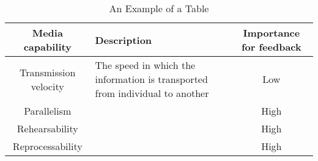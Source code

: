 \documentclass[conference]{IEEEtran}
\begin{document}
\begin{table}[!t]
\renewcommand{\arraystretch}{1.3}
\caption{An Example of a Table}
\label{table_example}
\centering
\begin{tabular}{|c|p{3cm}|c|}
\hline
\textbf{Media capability} & Description & \textbf{Importance for feedback}\\
\hline
Transmission velocity & The speed in which the information is transported from individual to another & Low\\
\hline
Parallelism & & High\\
\hline
Rehearsability & & High\\
\hline
Reprocessability & & High\\
\hline
\end{tabular}
\end{table}

\begin{comment}

NOPEA PÄÄTELMÄ: 
MST: Feedback: 

Contexti: Familiar, käytännössä siis: high conveyance, low convergence ==> less synchronicity

P1: Lower synchronicity
P2: Trasmission velocity improves synchronicity -> Lower transmission velovity
P3: Parallelism lower synchronicity -> High parallelism
P4(a): Natural symbols support synchronicity -> Use unnatural symbols
P4(b): Symbols better suited to content support synchronicity -> Use ill suited symbols
P5: Rehearsability lowers synchronicity -> High rehearsability
P6: Reproducability lowers synch -> High reproducability

--> 

lower transmission velocity, high parallelism, reharsability is important, high reprocessability -> Elektoriseen muotoon


\section{Call for new methods for feedback communication}

\textbf{TODO:} Why there's a need for new methods?

\textbf{TODO:} Introduce Hannotaatio

\textbf{TODO:} Evaluate Hannotaatio based on MRT and MST

\end{comment}
\end{document}
